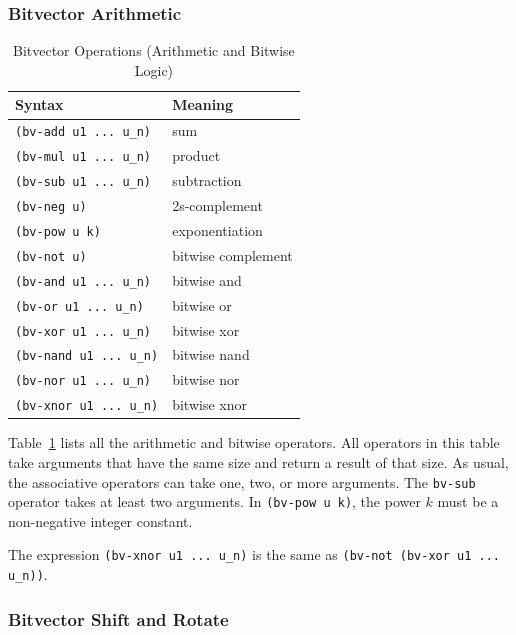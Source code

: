 \documentclass[11pt,twoside,fleqn,openright,titlepage]{cslreport}
\begin{document}
\subsubsection*{Bitvector Arithmetic}

\begin{table}
\begin{small}
\begin{center}
\begin{tabular}{|p{5cm}|l|}
\hline Syntax & Meaning \\ \hline \texttt{(bv-add u1 ... u\_n)} & sum
\\ \texttt{(bv-mul u1 ... u\_n)} & product \\ \texttt{(bv-sub u1
  ... u\_n)} & subtraction \\ \texttt{(bv-neg u)} & 2s-complement
\\ \texttt{(bv-pow u k)} & exponentiation \\ \hline \texttt{(bv-not
  u)} & bitwise complement \\ \texttt{(bv-and u1 ... u\_n)} & bitwise
and \\ \texttt{(bv-or u1 ... u\_n)} & bitwise or \\ \texttt{(bv-xor u1
  ... u\_n)} & bitwise xor \\ \texttt{(bv-nand u1 ... u\_n)} & bitwise
nand \\ \texttt{(bv-nor u1 ... u\_n)} & bitwise nor
\\ \texttt{(bv-xnor u1 ... u\_n)} & bitwise xnor \\ \hline
\end{tabular}
\end{center}
\end{small}
\caption{Bitvector Operations (Arithmetic and Bitwise Logic)}
\label{bitvectors1}
\end{table}

Table~\ref{bitvectors1} lists all the arithmetic and bitwise
operators. All operators in this table take arguments that have the
same size and return a result of that size.  As usual, the associative
operators can take one, two, or more arguments. The \texttt{bv-sub}
operator takes at least two arguments. In \texttt{(bv-pow u k)},
the power $k$ must be a non-negative integer constant.

\medskip\noindent
The expression \texttt{(bv-xnor u1 ... u\_n)} is the same as
\texttt{(bv-not (bv-xor u1 ... u\_n))}.

\subsubsection*{Bitvector Shift and Rotate}
\end{document}
